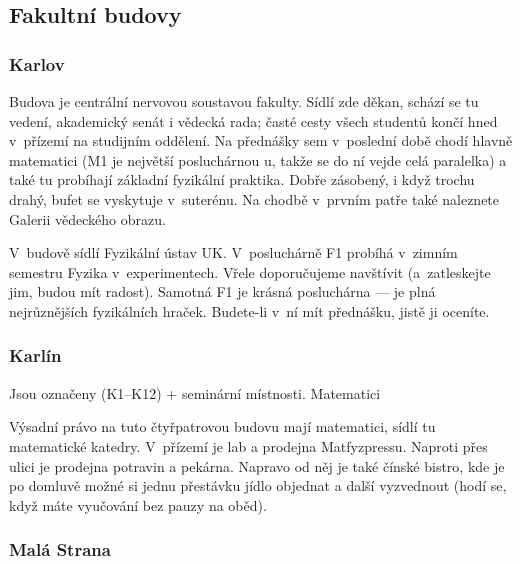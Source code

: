 \subsection{Fakultní budovy}
\smallskip %
\subsubsection{Karlov}



Budova  je centrální nervovou soustavou fakulty. Sídlí zde
děkan, schází se tu vedení, akademický senát i vědecká rada; časté
cesty všech studentů končí hned v~přízemí na studijním oddělení.
Na přednášky sem v~poslední době chodí hlavně matematici
(M1 je největší posluchárnou \mfz{}u, takže se do ní vejde celá
paralelka) a také tu probíhají základní fyzikální praktika.
Dobře zásobený, i když trochu drahý, bufet se vyskytuje
v~suterénu. Na chodbě v~prvním patře také naleznete Galerii
vědeckého obrazu.

V~budově  sídlí Fyzikální ústav UK. V~posluchárně F1 probíhá
v~zimním semestru  Fyzika v~experimentech.
Vřele do\-po\-ru\-ču\-je\-me navštívit (a~zatleskejte jim, budou mít
radost). Samotná F1 je krásná posluchárna --- je plná nejrůznějších
fyzikálních hraček. Budete-li v~ní mít přednášku, jistě ji
oceníte.

\subsubsection{Karlín}

 {Jsou označeny 
(K1--K12) + seminární místnosti.} {Matematici}

Výsadní právo na tuto čtyřpatrovou budovu mají matematici, sídlí
tu matematické katedry. V~přízemí je lab a prodejna Matfyzpressu.
Naproti přes ulici je prodejna potravin a pekárna. Napravo od něj
je také čínské bistro, kde je po domluvě možné si jednu přestávku
jídlo objednat a další vyzvednout (hodí se, když máte vyučování
bez pauzy na oběd).

\subsubsection{Malá Strana}

